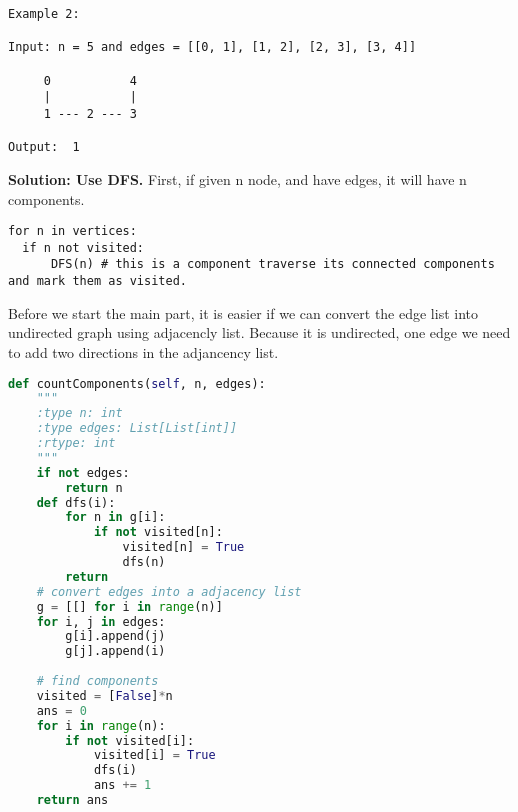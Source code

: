 \documentclass[../main.tex]{subfiles}
\begin{document}
\begin{examples}[resume]
\begin{lstlisting}[numbers=none]
Example 2:

Input: n = 5 and edges = [[0, 1], [1, 2], [2, 3], [3, 4]]

     0           4
     |           |
     1 --- 2 --- 3

Output:  1
\end{lstlisting}
\textbf{Solution: Use DFS.} First, if given n node, and have edges, it will have n components. 
\begin{lstlisting}[numbers=none]
for n in vertices:
  if n not visited:
      DFS(n) # this is a component traverse its connected components and mark them as visited. 
\end{lstlisting}
Before we start the main part, it is easier if we can convert the edge list into undirected graph using adjacencly list. Because it is undirected, one edge we need to add two directions in the adjancency list.
\begin{lstlisting}[language=Python]
def countComponents(self, n, edges):
    """
    :type n: int
    :type edges: List[List[int]]
    :rtype: int
    """
    if not edges:
        return n
    def dfs(i):
        for n in g[i]:
            if not visited[n]:
                visited[n] = True
                dfs(n)
        return
    # convert edges into a adjacency list
    g = [[] for i in range(n)]
    for i, j in edges:
        g[i].append(j)
        g[j].append(i)
    
    # find components
    visited = [False]*n
    ans = 0
    for i in range(n):
        if not visited[i]:
            visited[i] = True
            dfs(i)
            ans += 1
    return ans
\end{lstlisting}


\end{examples}
\end{document}
